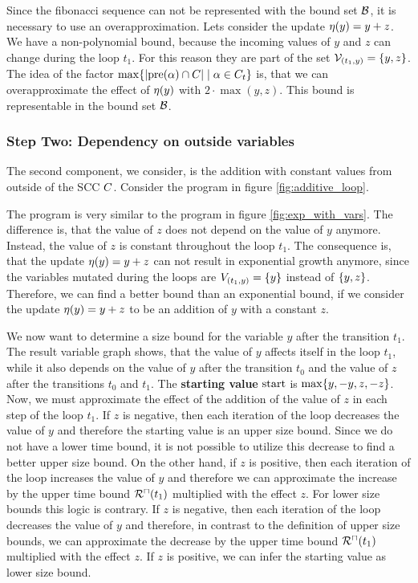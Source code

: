 Since the fibonacci sequence can not be represented with the bound set $\mathcal{B}$, it is necessary to use an overapproximation.
Lets consider the update $\eta(y) = y + z$.
We have a non-polynomial bound, because the incoming values of $y$ and $z$ can change during the loop $t_1$.
For this reason they are part of the set $\mathcal{V}_{(t_1,y)} = \lbrace y,z \rbrace$.
The idea of the factor $\max \lbrace \left|\text{pre}(\alpha) \cap C\right| \mid \alpha \in C_t \rbrace$ is, that we can overapproximate the effect of $\eta(y)$ with $2 \cdot \max(y,z)$.
This bound is representable in the bound set $\mathcal{B}$. 

\subsubsection{Step Two: Dependency on outside variables}

The second component, we consider, is the addition with constant values from outside of the SCC $C$.
Consider the program in figure \ref{fig:additive_loop}.



The program is very similar to the program in figure \ref{fig:exp_with_vars}.
The difference is, that the value of $z$ does not depend on the value of $y$ anymore.
Instead, the value of $z$ is constant throughout the loop $t_1$.
The consequence is, that the update $\eta(y) = y + z$ can not result in exponential growth anymore, since the variables mutated during the loops are $V_{(t_1,y)} = \lbrace y \rbrace$ instead of $\lbrace y,z \rbrace$.
Therefore, we can find a better bound than an exponential bound, if we consider the update $\eta(y) = y + z$ to be an addition of $y$ with a constant $z$.

We now want to determine a size bound for the variable $y$ after the transition $t_1$.
The result variable graph shows, that the value of $y$ affects itself in the loop $t_1$, while it also depends on the value of $y$ after the transition $t_0$ and the value of $z$ after the transitions $t_0$ and $t_1$.
The \textbf{starting value} $\text{start}$ is $\max \lbrace y,-y,z,-z \rbrace$.
Now, we must approximate the effect of the addition of the value of $z$ in each step of the loop $t_1$.
If $z$ is negative, then each iteration of the loop decreases the value of $y$ and therefore the starting value is an upper size bound.
Since we do not have a lower time bound, it is not possible to utilize this decrease to find a better upper size bound.
On the other hand, if $z$ is positive, then each iteration of the loop increases the value of $y$ and therefore we can approximate the increase by the upper time bound ${\mathcal{R}^\sqcap}(t_1)$ multiplied with the effect $z$.
For lower size bounds this logic is contrary.
If $z$ is negative, then each iteration of the loop decreases the value of $y$ and therefore, in contrast to the definition of upper size bounds, we can approximate the decrease by the upper time bound ${\mathcal{R}^\sqcap}(t_1)$ multiplied with the effect $z$.
If $z$ is positive, we can infer the starting value as lower size bound.

